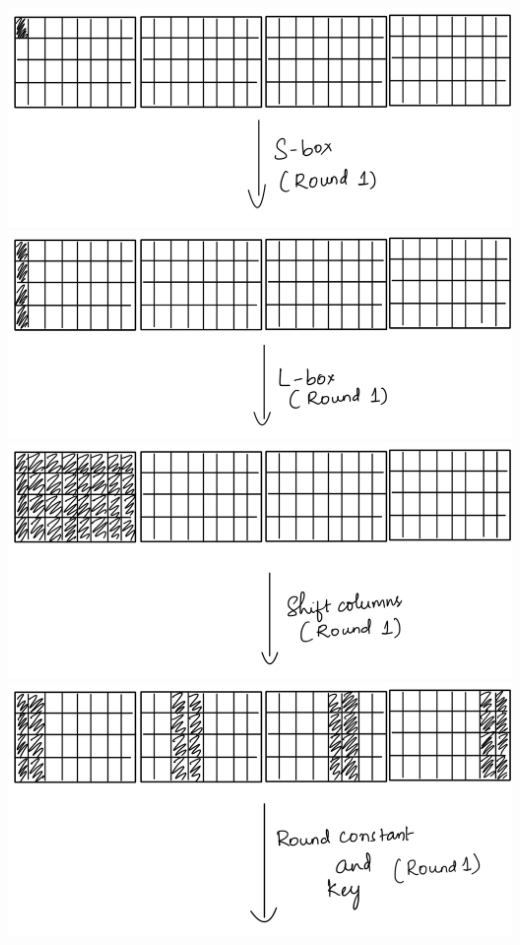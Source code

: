 \documentclass[preprint]{transcrypto}
\begin{document}
\begin{center}
    \includegraphics[scale=0.1]{PNG image.png}\\
    \includegraphics[scale=0.1]{PNG image-1.png}\\
    \includegraphics[scale=0.1]{PNG image-2.png}\\
    \includegraphics[scale=0.1]{PNG image-3.png}\\

\end{center}
\end{document}
